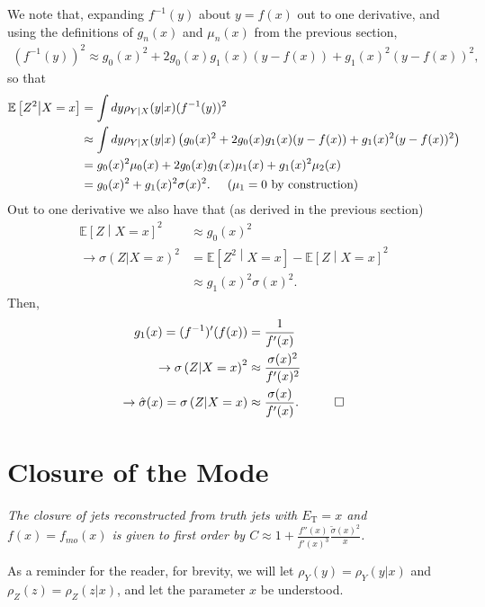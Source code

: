 We note that, expanding $f^{-1}(y)$ about $y=f(x)$ out to one derivative, and using the definitions of $g_n(x)$ and $\mu_n(x)$ from the previous section,
\begin{align}
(f^{-1}(y))^2 \approx g_0(x)^2+2g_0(x)g_1(x)(y-f(x))+g_1(x)^2(y-f(x))^2,
\end{align}
so that
\begin{align}
\mathbb{E}\left[Z^2\middle| X=x\right]&=\int dy \rho_{Y|X}(y|x) (f^{-1}(y))^2\nonumber\\
&\approx\int dy \rho_{Y|X}(y|x) \left(g_0(x)^2+2g_0(x)g_1(x)(y-f(x))+g_1(x)^2(y-f(x))^2\right)\nonumber\\
&=g_0(x)^2\mu_0(x)+2g_0(x)g_1(x)\mu_1(x)+g_1(x)^2\mu_2(x)\nonumber\\
&=g_0(x)^2+g_1(x)^2\sigma(x)^2.\hspace{5mm}\text{($\mu_1=0$ by construction)}
\end{align}
Out to one derivative we also have that (as derived in the previous section)
\begin{align}
\mathbb{E}\left[Z\middle| X=x\right]^2 &\approx g_0(x)^2\nonumber\\
\rightarrow \sigma\left(Z|X=x\right)^2 &= \mathbb{E}\left[Z^2\middle| X=x\right]-\mathbb{E}\left[Z\middle| X=x\right]^2\nonumber\\
&\approx g_1(x)^2\sigma(x)^2.
\end{align}
Then,
\begin{align}
g_1(x) = (f^{-1})'(f(x)) &= \frac{1}{f'(x)}\nonumber\\
\rightarrow \sigma\left(Z|X=x\right)^2 &\approx \frac{\sigma(x)^2}{f'(x)^2}\nonumber\\
\rightarrow \hat{\sigma}(x)=\sigma\left(Z|X=x\right) &\approx \frac{\sigma(x)}{f'(x)}. \hspace{1 cm} \Box \label{eqn:resolution}
\end{align}

\newpage
\section{Closure of the Mode}
\label{sec:calibrated_mode_calculation}
{\it The closure of jets reconstructed from truth jets with $E_\text{T} = x$ and $f(x)=f_{mo}(x)$ is given to first order by $C\approx 1+\frac{f''(x)}{f'(x)^3}\frac{\tilde{\sigma}(x)^2}{x}$.}

\vspace{5mm}

As a reminder for the reader, for brevity, we will let $\rho_Y(y)=\rho_Y(y|x)$ and $\rho_Z(z)=\rho_Z(z|x)$, and let the parameter $x$ be understood.

